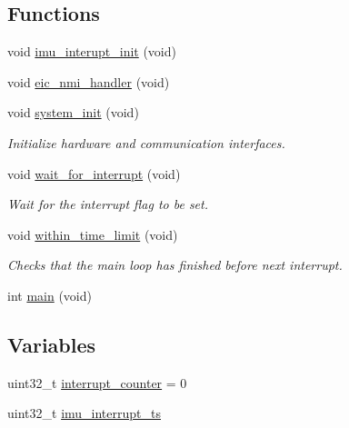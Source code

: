 \subsection*{\-Functions}
\begin{DoxyCompactItemize}
\item 
void \hyperlink{group__openshoe__software_gab157d45366997e63d5799b3f93a8ad40}{imu\-\_\-interupt\-\_\-init} (void)
\item 
void \hyperlink{group__openshoe__software_ga704ef9a891717a7ad0e0248601e6d8e4}{eic\-\_\-nmi\-\_\-handler} (void)
\item 
void \hyperlink{group__openshoe__software_ga43f5e0d6db0fb41a437cc9096b32e9b5}{system\-\_\-init} (void)
\begin{DoxyCompactList}\small\item\em \-Initialize hardware and communication interfaces. \end{DoxyCompactList}\item 
void \hyperlink{group__openshoe__software_gaa860f79f0ccbec4ade4b9b5f2173f05a}{wait\-\_\-for\-\_\-interrupt} (void)
\begin{DoxyCompactList}\small\item\em \-Wait for the interrupt flag to be set. \end{DoxyCompactList}\item 
void \hyperlink{group__openshoe__software_gab84fcc7107ace73c7c806351d3dd27f7}{within\-\_\-time\-\_\-limit} (void)
\begin{DoxyCompactList}\small\item\em \-Checks that the main loop has finished before next interrupt. \end{DoxyCompactList}\item 
int \hyperlink{group__openshoe__software_ga840291bc02cba5474a4cb46a9b9566fe}{main} (void)
\end{DoxyCompactItemize}
\subsection*{\-Variables}
\begin{DoxyCompactItemize}
\item 
uint32\-\_\-t \hyperlink{group__openshoe__software_gae1dde88f49a15ac8b44d187ed1a2c2f4}{interrupt\-\_\-counter} = 0
\item 
uint32\-\_\-t \hyperlink{group__openshoe__software_gabab0bf40697a144a8e46dfe6c4290656}{imu\-\_\-interrupt\-\_\-ts}
\end{DoxyCompactItemize}


